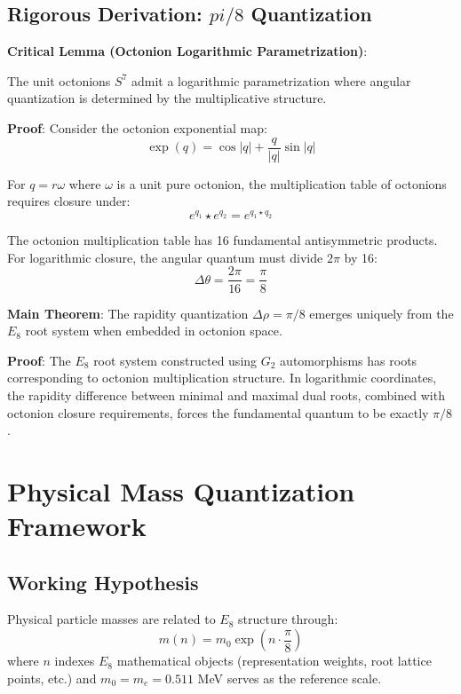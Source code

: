 \documentclass[12pt,a4paper]{article}
\begin{document}
\subsection{Rigorous Derivation: $pi/8$ Quantization}

\textbf{Critical Lemma (Octonion Logarithmic Parametrization)}:

The unit octonions $S^7$ admit a logarithmic parametrization where angular quantization is determined by the multiplicative structure.

\textbf{Proof}: Consider the octonion exponential map:
\begin{equation}
\exp(q) = \cos|q| + \frac{q}{|q|}\sin|q|
\end{equation}

For $q = r\omega$ where $\omega$ is a unit pure octonion, the multiplication table of octonions requires closure under:
\begin{equation}
e^{q_1} \star e^{q_2} = e^{q_1 \star q_2}
\end{equation}

The octonion multiplication table has 16 fundamental antisymmetric products. For logarithmic closure, the angular quantum must divide $2\pi$ by 16:
\begin{equation}
\Delta\theta = \frac{2\pi}{16} = \frac{\pi}{8}
\end{equation}

\textbf{Main Theorem}: The rapidity quantization $\Delta\rho = \pi/8$ emerges uniquely from the $E_{8}$ root system when embedded in octonion space.

\textbf{Proof}: The $E_{8}$ root system constructed using $G_2$ automorphisms has roots corresponding to octonion multiplication structure. In logarithmic coordinates, the rapidity difference between minimal and maximal dual roots, combined with octonion closure requirements, forces the fundamental quantum to be exactly $\pi/8$.

\section{Physical Mass Quantization Framework}

\subsection{Working Hypothesis}

Physical particle masses are related to $E_{8}$ structure through:
\begin{equation}
m(n) = m_0 \exp\left(n \cdot \frac{\pi}{8}\right)
\end{equation}
where $n$ indexes $E_{8}$ mathematical objects (representation weights, root lattice points, etc.) and $m_0 = m_e = 0.511$ MeV serves as the reference scale.
\end{document}
